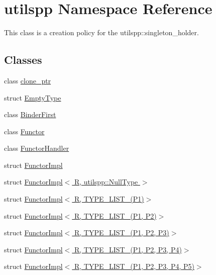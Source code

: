 \hypertarget{namespaceutilspp}{\section{utilspp Namespace Reference}
\label{namespaceutilspp}
}


This class is a creation policy for the utilspp\-::singleton\-\_\-holder.  


\subsection*{Classes}
\begin{DoxyCompactItemize}
\item 
class \hyperlink{classutilspp_1_1clone__ptr}{clone\-\_\-ptr}
\item 
struct \hyperlink{structutilspp_1_1EmptyType}{Empty\-Type}
\item 
class \hyperlink{classutilspp_1_1BinderFirst}{Binder\-First}
\item 
class \hyperlink{classutilspp_1_1Functor}{Functor}
\item 
class \hyperlink{classutilspp_1_1FunctorHandler}{Functor\-Handler}
\item 
struct \hyperlink{structutilspp_1_1FunctorImpl}{Functor\-Impl}
\item 
struct \hyperlink{structutilspp_1_1FunctorImpl_3_01R_00_01utilspp_1_1NullType_01_4}{Functor\-Impl$<$ R, utilspp\-::\-Null\-Type $>$}
\item 
struct \hyperlink{structutilspp_1_1FunctorImpl_3_01R_00_01TYPE__LIST__1_07P1_08_4}{Functor\-Impl$<$ R, T\-Y\-P\-E\-\_\-\-L\-I\-S\-T\-\_(\-P1)$>$}
\item 
struct \hyperlink{structutilspp_1_1FunctorImpl_3_01R_00_01TYPE__LIST__2_07P1_00_01P2_08_4}{Functor\-Impl$<$ R, T\-Y\-P\-E\-\_\-\-L\-I\-S\-T\-\_(\-P1, P2)$>$}
\item 
struct \hyperlink{structutilspp_1_1FunctorImpl_3_01R_00_01TYPE__LIST__3_07P1_00_01P2_00_01P3_08_4}{Functor\-Impl$<$ R, T\-Y\-P\-E\-\_\-\-L\-I\-S\-T\-\_(\-P1, P2, P3)$>$}
\item 
struct \hyperlink{structutilspp_1_1FunctorImpl_3_01R_00_01TYPE__LIST__4_07P1_00_01P2_00_01P3_00_01P4_08_4}{Functor\-Impl$<$ R, T\-Y\-P\-E\-\_\-\-L\-I\-S\-T\-\_(\-P1, P2, P3, P4)$>$}
\item 
struct \hyperlink{structutilspp_1_1FunctorImpl_3_01R_00_01TYPE__LIST__5_07P1_00_01P2_00_01P3_00_01P4_00_01P5_08_4}{Functor\-Impl$<$ R, T\-Y\-P\-E\-\_\-\-L\-I\-S\-T\-\_(\-P1, P2, P3, P4, P5)$>$}

\end{DoxyCompactItemize}

